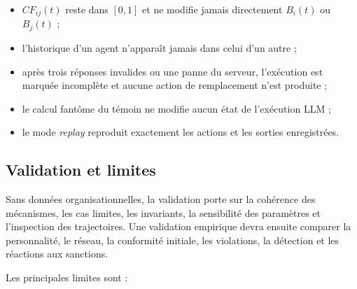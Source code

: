 \documentclass[10pt,a4paper]{article}
\begin{document}
\begin{itemize}
  une posture d’opposition ou d’avertissement ;
  \item $CF_{ij}(t)$ reste dans $[0,1]$ et ne modifie jamais directement
  $B_i(t)$ ou $B_j(t)$ ;
  \item l’historique d’un agent n’apparaît jamais dans celui d’un autre ;
  \item après trois réponses invalides ou une panne du serveur, l’exécution est
  marquée incomplète et aucune action de remplacement n’est produite ;
  \item le calcul fantôme du témoin ne modifie aucun état de l’exécution LLM ;
  \item le mode \emph{replay} reproduit exactement les actions et les sorties
  enregistrées.
\end{itemize}

\subsection{Validation et limites}

Sans données organisationnelles, la validation porte sur la cohérence des
mécanismes, les cas limites, les invariants, la sensibilité des paramètres et
l’inspection des trajectoires. Une validation empirique devra ensuite comparer
la personnalité, le réseau, la conformité initiale, les violations, la
détection et les réactions aux sanctions.

Les principales limites sont :
\end{document}
